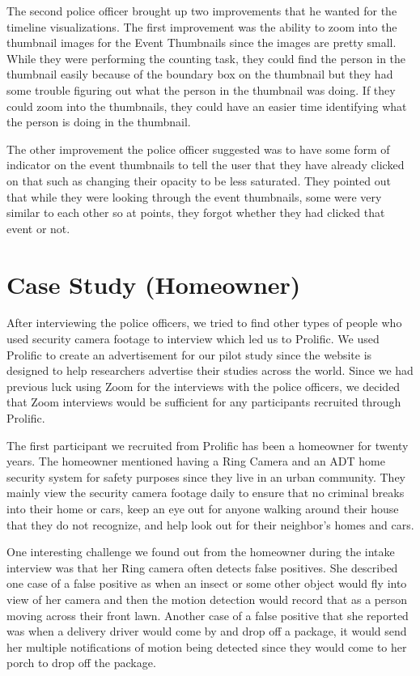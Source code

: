 \documentclass[doublespace,draft,nopageskip]{VTthesis} %
\begin{document}
The second police officer brought up two improvements that he wanted for the timeline visualizations. The first improvement was the ability to zoom into the thumbnail images for the Event Thumbnails since the images are pretty small. While they were performing the counting task, they could find the person in the thumbnail easily because of the boundary box on the thumbnail but they had some trouble figuring out what the person in the thumbnail was doing. If they could zoom into the thumbnails, they could have an easier time identifying what the person is doing in the thumbnail.

The other improvement the police officer suggested was to have some form of indicator on the event thumbnails to tell the user that they have already clicked on that such as changing their opacity to be less saturated. They pointed out that while they were looking through the event thumbnails, some were very similar to each other so at points, they forgot whether they had clicked that event or not.

\section{Case Study (Homeowner)} \label{se:one_section}
After interviewing the police officers, we tried to find other types of people who used security camera footage to interview which led us to Prolific. We used Prolific to create an advertisement for our pilot study since the website is designed to help researchers advertise their studies across the world. Since we had previous luck using Zoom for the interviews with the police officers, we decided that Zoom interviews would be sufficient for any participants recruited through Prolific. 

The first participant we recruited from Prolific has been a homeowner for twenty years. The homeowner mentioned having a Ring Camera and an ADT home security system for safety purposes since they live in an urban community. They mainly view the security camera footage daily to ensure that no criminal breaks into their home or cars, keep an eye out for anyone walking around their house that they do not recognize, and help look out for their neighbor's homes and cars.

One interesting challenge we found out from the homeowner during the intake interview was that her Ring camera often detects false positives. She described one case of a false positive as when an insect or some other object would fly into view of her camera and then the motion detection would record that as a person moving across their front lawn. Another case of a false positive that she reported was when a delivery driver would come by and drop off a package, it would send her multiple notifications of motion being detected since they would come to her porch to drop off the package.
\end{document}
